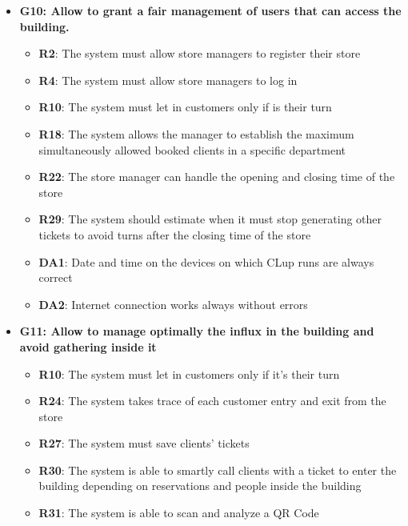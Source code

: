 \documentclass{article}
\begin{document}
\begin{itemize}
\begin{itemize}
					\end{itemize}

				\item {\bfseries G10: Allow to grant a fair management of users that can access the building.}	

					\begin{itemize}
						
						\item {\bfseries R2}: The system must allow store managers to register their store
						\item {\bfseries R4}: The system must allow store managers to log in
						\item {\bfseries R10}: The system must let in customers only if is their turn
						\item {\bfseries R18}: The system allows the manager to establish the maximum simultaneously allowed booked clients in a specific department
						\item {\bfseries R22}: The store manager can handle the opening and closing time of the store
						\item {\bfseries R29}: The system should estimate when it must stop generating other tickets to avoid turns after the closing time of the store \\
						
						\item {\bfseries DA1}: Date and time on the devices on which CLup runs are always correct
						\item {\bfseries DA2}: Internet connection works always without errors
					
					\end{itemize}
				
				\item {\bfseries G11: Allow to manage optimally the influx in the building and avoid gathering inside it}	

					\begin{itemize}
						
						\item {\bfseries R10}: The system must let in customers only if it's their turn
						\item {\bfseries R24}: The system takes trace of each customer entry and exit from the store
						\item {\bfseries R27}: The system must save clients’ tickets				
						\item {\bfseries R30}: The system is able to smartly call clients with a ticket to enter the building depending on reservations and people inside the building
						\item {\bfseries R31}: The system is able to scan and analyze a QR Code \\
		

\end{itemize}
\end{itemize}
\end{document}
